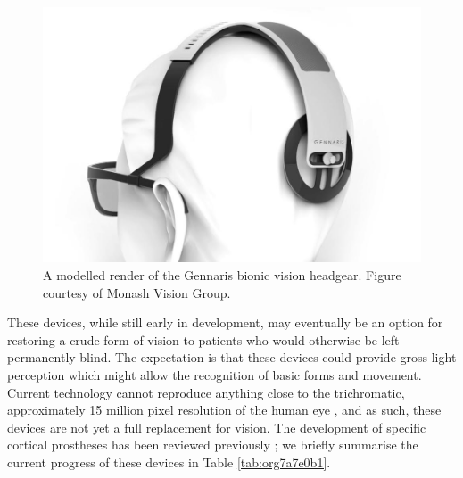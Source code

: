 \documentclass[a4paper,11pt,openany]{book}
\begin{document}
\begin{figure}[htbp]
\centering
\includegraphics[width=.9\linewidth]{./graphics/litreview/headgear2.jpg}
\caption[Modelled render of the Gennaris bionic vision headgear]{\label{fig:orged824e5}
A modelled render of the Gennaris bionic vision headgear. Figure courtesy of Monash Vision Group.}
\end{figure}

These devices, while still early in development, may eventually be an option for restoring a crude form of vision to patients who would otherwise be left permanently blind.
The expectation is that these devices could provide gross light perception which might allow the recognition of basic forms and movement. \cite{lowery_monash_2017,lowery_restoration_2015}
Current technology cannot reproduce anything close to the trichromatic, approximately 15 million pixel resolution of the human eye \cite{deering_limits_1998}, and as such, these devices are not yet a full replacement for vision.
The development of specific cortical prostheses has been reviewed previously \cite{niketeghad_brain_2019}; we briefly summarise the current progress of these devices in Table \ref{tab:org7a7e0b1}.

\renewcommand{\arraystretch}{1.5}
\end{document}
